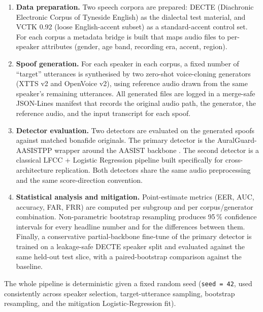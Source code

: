\begin{enumerate}
    \item \textbf{Data preparation.} Two speech corpora are prepared: DECTE
        (Diachronic Electronic Corpus of Tyneside English) as the dialectal
        test material, and VCTK 0.92 (loose English-accent subset) as a
        standard-accent control set. For each corpus a metadata bridge is
        built that maps audio files to per-speaker attributes (gender,
        age band, recording era, accent, region).
    \item \textbf{Spoof generation.} For each speaker in each corpus, a fixed
        number of ``target'' utterances is synthesised by two zero-shot
        voice-cloning generators (XTTS v2 and OpenVoice v2), using
        reference audio drawn from the same speaker's remaining utterances.
        All generated files are logged in a merge-safe JSON-Lines manifest
        that records the original audio path, the generator, the reference
        audio, and the input transcript for each spoof.
    \item \textbf{Detector evaluation.} Two detectors are evaluated on the
        generated spoofs against matched bonafide originals. The primary
        detector is the AuralGuard-AASISTPP wrapper around the AASIST
        backbone \cite{Jung2022_AASIST}. The second detector is a classical
        LFCC + Logistic Regression pipeline built specifically for
        cross-architecture replication. Both detectors share the same
        audio preprocessing and the same score-direction convention.
    \item \textbf{Statistical analysis and mitigation.} Point-estimate metrics
        (EER, AUC, accuracy, FAR, FRR) are computed per subgroup and per
        corpus/generator combination. Non-parametric bootstrap resampling
        produces 95\,\% confidence intervals for every headline number and
        for the differences between them. Finally, a conservative
        partial-backbone fine-tune of the primary detector is trained on
        a leakage-safe DECTE speaker split and evaluated against the same
        held-out test slice, with a paired-bootstrap comparison against
        the baseline.
\end{enumerate}

The whole pipeline is deterministic given a fixed random seed
(\texttt{seed = 42}, used consistently across speaker selection,
target-utterance sampling, bootstrap resampling, and the mitigation
Logistic-Regression fit).

